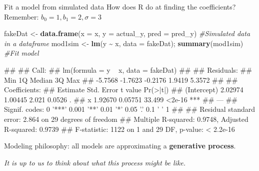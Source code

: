 \documentclass[
  ignorenonframetext,
  aspectratio=169]{beamer}
\newenvironment{Shaded}{\begin{snugshade}}{\end{snugshade}}
\newcommand{\AttributeTok}[1]{\textcolor[rgb]{0.13,0.29,0.53}{#1}}
\newcommand{\CommentTok}[1]{\textcolor[rgb]{0.56,0.35,0.01}{\textit{#1}}}
\newcommand{\FunctionTok}[1]{\textcolor[rgb]{0.13,0.29,0.53}{\textbf{#1}}}
\newcommand{\NormalTok}[1]{#1}
\newcommand{\OtherTok}[1]{\textcolor[rgb]{0.56,0.35,0.01}{#1}}
\newcommand{\SpecialCharTok}[1]{\textcolor[rgb]{0.81,0.36,0.00}{\textbf{#1}}}
\let\oldShaded\Shaded %
\let\endoldShaded\endShaded
\renewenvironment{Shaded}{\scriptsize\oldShaded}{\endoldShaded}
\let\oldverbatim\verbatim %
\let\endoldverbatim\endverbatim
\renewenvironment{verbatim}{\tiny\oldverbatim}{\endoldverbatim}
\begin{document}
\begin{frame}[fragile]{Fit a model from simulated data}
\protect\hypertarget{fit-a-model-from-simulated-data}{}
How does R do at finding the coefficients? Remember:
\(b_0 = 1, b_1 = 2, \sigma = 3\)

\begin{Shaded}
\begin{Highlighting}[]
\NormalTok{fakeDat }\OtherTok{\textless{}{-}} \FunctionTok{data.frame}\NormalTok{(}\AttributeTok{x =}\NormalTok{ x, }\AttributeTok{y =}\NormalTok{ actual\_y, }\AttributeTok{pred =}\NormalTok{ pred\_y) }\CommentTok{\#Simulated data in a dataframe }
\NormalTok{mod1sim }\OtherTok{\textless{}{-}} \FunctionTok{lm}\NormalTok{(y }\SpecialCharTok{\textasciitilde{}}\NormalTok{ x, }\AttributeTok{data =}\NormalTok{ fakeDat); }\FunctionTok{summary}\NormalTok{(mod1sim) }\CommentTok{\#Fit model}
\end{Highlighting}
\end{Shaded}

\begin{verbatim}
## 
## Call:
## lm(formula = y ~ x, data = fakeDat)
## 
## Residuals:
##     Min      1Q  Median      3Q     Max 
## -5.7568 -1.7623 -0.2176  1.9419  5.3572 
## 
## Coefficients:
##             Estimate Std. Error t value Pr(>|t|)    
## (Intercept)  2.02974    1.00445   2.021   0.0526 .  
## x            1.92670    0.05751  33.499   <2e-16 ***
## ---
## Signif. codes:  0 '***' 0.001 '**' 0.01 '*' 0.05 '.' 0.1 ' ' 1
## 
## Residual standard error: 2.864 on 29 degrees of freedom
## Multiple R-squared:  0.9748, Adjusted R-squared:  0.9739 
## F-statistic:  1122 on 1 and 29 DF,  p-value: < 2.2e-16
\end{verbatim}

\pause

Modeling philosophy: all models are approximating a \textbf{generative
process}.

\emph{It is up to us to think about what this process might be like.}
\end{frame}
\end{document}

